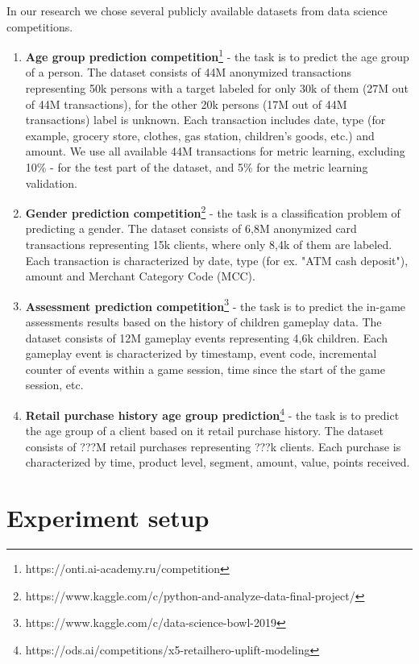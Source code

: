 \documentclass{article}
\begin{document}
In our research we chose several publicly available datasets from data science competitions.
\begin{enumerate}
    \item \textbf{Age group prediction competition}\footnote{https://onti.ai-academy.ru/competition} - the task is to predict the age group of a person. The dataset consists of 44M anonymized transactions representing 50k persons with a target labeled for only 30k of them (27M out of 44M transactions), for the other 20k persons (17M out of 44M transactions) label is unknown. Each transaction includes date, type (for example, grocery store, clothes, gas station, children's goods, etc.) and amount. We use all available 44M transactions for metric learning, excluding 10\% - for the test part of the dataset, and  5\% for the metric learning validation.
        
    \item \textbf{Gender prediction competition}\footnote{https://www.kaggle.com/c/python-and-analyze-data-final-project/} - the task is a classification problem of predicting a gender. The dataset consists of 6,8M anonymized card transactions representing 15k clients, where only 8,4k of them are labeled. Each transaction is characterized by date, type (for ex. "ATM cash deposit"), amount and Merchant Category Code (MCC).
    
    \item \textbf{Assessment prediction competition}\footnote{https://www.kaggle.com/c/data-science-bowl-2019} - the task is to predict the in-game assessments results based on the history of children gameplay data. The dataset consists of 12M gameplay events representing 4,6k children. Each gameplay event is characterized by timestamp, event code, incremental counter of events within a game session, time since the start of the game session, etc.
    
    \item \textbf{Retail purchase history age group prediction}\footnote{https://ods.ai/competitions/x5-retailhero-uplift-modeling} - the task is to predict the age group of a client based on it retail purchase history. The dataset consists of ???M retail purchases representing ???k clients. Each purchase is characterized by time, product level, segment, amount, value, points received.

\end{enumerate}

\section{Experiment setup} \label{app-sec-exp-setup}
\end{document}
